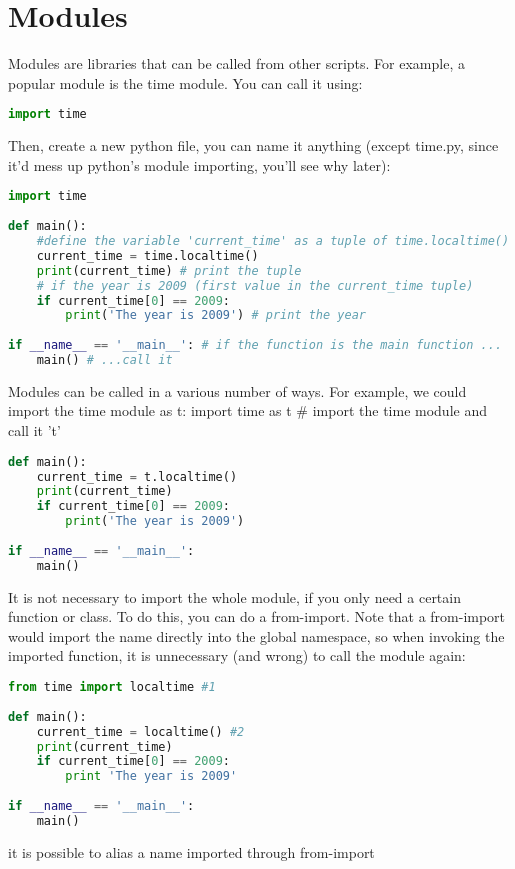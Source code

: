 \section{Modules}
Modules are libraries that can be called from other scripts. For example, a
popular module is the time module. You can call it using:
\lstset{basicstyle=\scriptsize, numbers=left, captionpos=b, tabsize=4}
\begin{lstlisting}[caption=Basic Import,language={Python},
xleftmargin=15pt, label=lst:basicimport]
import time
\end{lstlisting}

Then, create a new python file, you can name it anything (except time.py, since
it'd mess up python's module importing, you'll see why later):
\lstset{basicstyle=\scriptsize, numbers=left, captionpos=b, tabsize=4}
\begin{lstlisting}[caption=Name imported Module 1,language={Python},
xleftmargin=15pt, label=lst:nameimportedmodule1]
import time
 
def main():
    #define the variable 'current_time' as a tuple of time.localtime()
    current_time = time.localtime() 
    print(current_time) # print the tuple
    # if the year is 2009 (first value in the current_time tuple)
    if current_time[0] == 2009: 
        print('The year is 2009') # print the year
 
if __name__ == '__main__': # if the function is the main function ...
    main() # ...call it
\end{lstlisting}

Modules can be called in a various number of ways. For example, we could import
the time module as t: import time as t \# import the time module and call it 't'
\lstset{basicstyle=\scriptsize, numbers=left, captionpos=b, tabsize=4}
\begin{lstlisting}[caption=Name imported Module 2,language={Python},
xleftmargin=15pt, label=lst:nameimportedmodule2]
def main():
    current_time = t.localtime() 
    print(current_time)
    if current_time[0] == 2009: 
        print('The year is 2009')
 
if __name__ == '__main__': 
    main()
\end{lstlisting}

It is not necessary to import the whole module, if you only need a certain
function or class. To do this, you can do a from-import. Note that a from-import
would import the name directly into the global namespace, so when invoking the
imported function, it is unnecessary (and wrong) to call the module again:
\lstset{basicstyle=\scriptsize, numbers=left, captionpos=b, tabsize=4}
\begin{lstlisting}[caption=Select Import,language={Python},
xleftmargin=15pt, label=lst:selectimport]
from time import localtime #1
 
def main():
    current_time = localtime() #2
    print(current_time)
    if current_time[0] == 2009: 
        print 'The year is 2009'
 
if __name__ == '__main__': 
    main()
\end{lstlisting}
it is possible to alias a name imported through from-import

